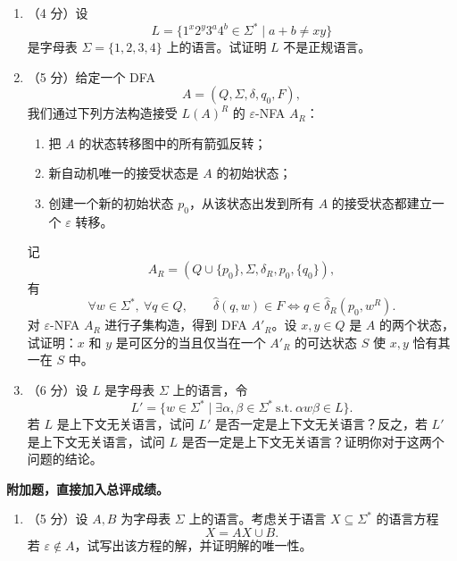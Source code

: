\documentclass[UTF8,zihao=5]{ctexart}
\newcommand{\examheading}[1]{\par\medskip\noindent\textbf{#1。}\par}
\begin{document}
\begin{enumerate}[start=27]
  \item （4 分）设
  \[
    L=\{1^x2^y3^a4^b\in\Sigma^*\mid a+b\ne xy\}
  \]
  是字母表 $\Sigma=\{1,2,3,4\}$ 上的语言。试证明 $L$ 不是正规语言。

  \item （5 分）给定一个 DFA
  \[
    A=(Q,\Sigma,\delta,q_0,F),
  \]
  我们通过下列方法构造接受 $L(A)^R$ 的 $\varepsilon$-NFA $A_R$：
  \begin{enumerate}[label=(\arabic*)]
    \item 把 $A$ 的状态转移图中的所有箭弧反转；
    \item 新自动机唯一的接受状态是 $A$ 的初始状态；
    \item 创建一个新的初始状态 $p_0$，从该状态出发到所有 $A$ 的接受状态都建立一个 $\varepsilon$ 转移。
  \end{enumerate}
  记
  \[
    A_R=(Q\cup\{p_0\},\Sigma,\delta_R,p_0,\{q_0\}),
  \]
  有
  \[
    \forall w\in\Sigma^*,\ \forall q\in Q,\qquad
    \hat{\delta}(q,w)\in F \Longleftrightarrow q\in\hat{\delta}_R(p_0,w^R).
  \]
  对 $\varepsilon$-NFA $A_R$ 进行子集构造，得到 DFA $A'_R$。设 $x,y\in Q$ 是 $A$ 的两个状态，试证明：$x$ 和 $y$ 是可区分的当且仅当在一个 $A'_R$ 的可达状态 $S$ 使 $x,y$ 恰有其一在 $S$ 中。

  \item （6 分）设 $L$ 是字母表 $\Sigma$ 上的语言，令
  \[
    L'=\{w\in\Sigma^*\mid \exists \alpha,\beta\in\Sigma^*\ \text{s.t.}\ \alpha w\beta\in L\}.
  \]
  若 $L$ 是上下文无关语言，试问 $L'$ 是否一定是上下文无关语言？反之，若 $L'$ 是上下文无关语言，试问 $L$ 是否一定是上下文无关语言？证明你对于这两个问题的结论。

\end{enumerate}

\examheading{附加题，直接加入总评成绩}
\begin{enumerate}[start=30]
  \item （5 分）设 $A,B$ 为字母表 $\Sigma$ 上的语言。考虑关于语言 $X\subseteq\Sigma^*$ 的语言方程
\[
  X=AX\cup B.
\]
若 $\varepsilon\notin A$，试写出该方程的解，并证明解的唯一性。
\end{enumerate}

\newpage
\null
\end{document}
